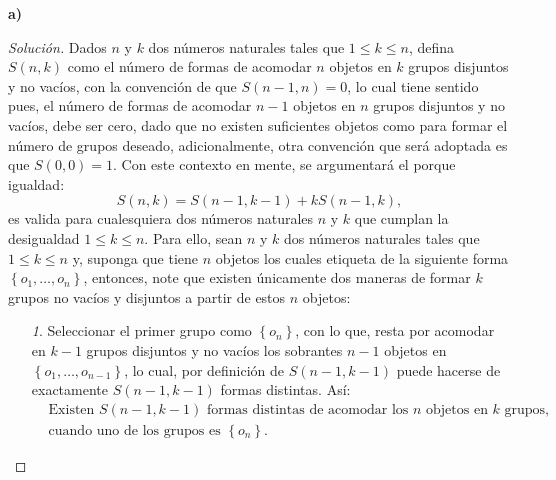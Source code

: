 \documentclass[10.5pt,notitlepage]{article}
\newenvironment{solucion}
  {\begin{proof}[Solución]}
  {\end{proof}}
\newcommand{\kis}[1]{\left\{ #1 \right\}}
\theoremstyle{plain}
\begin{document}
\begin{exo}

\end{exo}
\textbf{a)}
\begin{solucion}
Dados \(n\) y \(k\) dos números naturales tales que \(1 \leq k \leq n\), defina \(S(n,k)\) como el número de formas de acomodar \(n\) objetos en \(k\) grupos disjuntos y no vacíos, con la convención de que \(S(n-1,n) = 0\), lo cual tiene sentido pues, el número de formas de acomodar \(n-1\) objetos en \(n\) grupos disjuntos y no vacíos, debe ser cero, dado que no existen suficientes objetos como para formar el número de grupos deseado, adicionalmente, otra convención que será adoptada es que \(S(0,0) = 1\). Con este contexto en mente, se argumentará el porque igualdad: 
\[
S(n,k) = S(n-1,k-1) + k S(n-1,k),
\]
es valida para cualesquiera dos números naturales \(n\) y \(k\) que cumplan la desigualdad \(1 \leq k \leq n\). Para ello, sean \(n\) y \(k\) dos números naturales tales que \(1 \leq k \leq n\) y, suponga que tiene \(n\) objetos los cuales etiqueta de la siguiente forma \(\kis{o_1, \hdots, o_n}\), entonces, note que existen únicamente dos maneras de formar \(k\) grupos no vacíos y disjuntos a partir de estos \(n\) objetos:
\begin{enumerate}
    \item[\textit{1}.] Seleccionar el primer grupo como \(\kis{o_n}\), con lo que, resta por acomodar en \(k - 1\) grupos disjuntos y no vacíos los sobrantes \(n-1\) objetos en \(\kis{o_1, \hdots, o_{n-1}}\), lo cual, por definición de \(S(n-1,k-1)\) puede hacerse de exactamente \(S(n-1, k-1)\) formas distintas. Así:
    \begin{align*}
        &\text{Existen \(S(n-1, k-1)\) formas distintas de acomodar los \(n\) objetos en \(k\) grupos,}\\
        &\text{cuando uno de los grupos es \(\kis{o_n}\).}
    \end{align*}

\end{enumerate}
\end{solucion}
\end{document}
